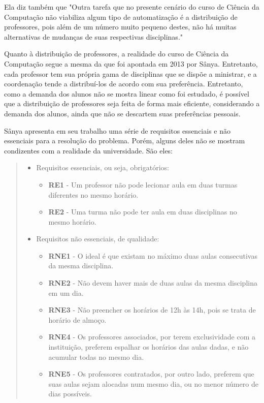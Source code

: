 Ela diz também que "Outra tarefa que no presente cenário do curso de Ciência da Computação não viabiliza algum tipo de automatização é a distribuição de professores, pois além de um número muito pequeno destes, não há muitas alternativas de mudanças de suas respectivas disciplinas."

Quanto à distribuição de professores, a realidade do curso de Ciência da Computação segue a mesma da que foi apontada em 2013 por Sânya. Entretanto, cada professor tem sua própria gama de disciplinas que se dispõe a ministrar, e a coordenação tende a distribuí-los de acordo com sua preferência. Entretanto, como a demanda dos alunos não se mostra linear como foi estudado, é possível que a distribuição de professores seja feita de forma mais eficiente, considerando a demanda dos alunos, ainda que não se descartem suas preferências pessoais.

Sânya apresenta em seu trabalho uma série de requisitos essenciais e não essenciais para a resolução do problema. Porém, alguns deles não se mostram condizentes com a realidade da universidade. São eles:

\begin{quote}\footnotesize
  \begin{itemize}
    \item Requisitos essenciais, ou seja, obrigatórios:
          \begin{itemize}
            \item \textbf{RE1} - Um professor não pode lecionar aula em duas turmas diferentes no mesmo horário.
            \item \textbf{RE2} - Uma turma não pode ter aula em duas disciplinas no mesmo horário.
          \end{itemize}
    \item Requisitos não essenciais, de qualidade:
          \begin{itemize}
            \item \textbf{RNE1} - O ideal é que existam no máximo duas aulas consecutivas da mesma disciplina.
            \item \textbf{RNE2} - Não devem haver mais de duas aulas da mesma disciplina em um dia.
            \item \textbf{RNE3} - Não preencher os horários de 12h às 14h, pois se trata de horário de almoço.
            \item \textbf{RNE4} - Os professores associados, por terem exclusividade com a instituição, preferem espalhar os horários das aulas dadas, e não acumular todas no mesmo dia.
            \item \textbf{RNE5} - Os professores contratados, por outro lado, preferem que suas aulas sejam alocadas num mesmo dia, ou no menor número de dias possíveis.
          \end{itemize}
  \end{itemize}
\end{quote}

